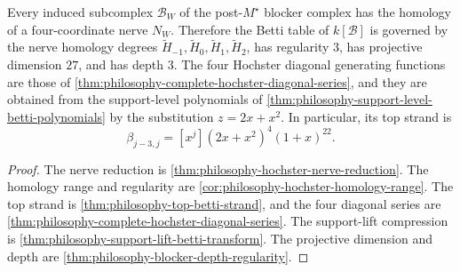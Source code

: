 \begin{theorem}
\label{thm:philosophy-hochster-nerve-betti-theorem}
Every induced subcomplex $\mathcal{B}_{W}$ of the post-$M^{\star}$
blocker complex has the homology of a four-coordinate nerve $N_{W}$.
Therefore the Betti table of $k[\mathcal{B}]$ is governed by the nerve
homology degrees $\widetilde{H}_{-1},\widetilde{H}_{0},
\widetilde{H}_{1},\widetilde{H}_{2}$, has regularity $3$, has
projective dimension $27$, and has depth $3$. The four Hochster
diagonal generating functions are those of
\autoref{thm:philosophy-complete-hochster-diagonal-series}, and they
are obtained from the support-level polynomials of
\autoref{thm:philosophy-support-level-betti-polynomials} by the
substitution $z=2x+x^{2}$. In particular, its top strand is
$$
  \beta_{j-3,j}
  =
  [x^{j}](2x+x^{2})^{4}(1+x)^{22}.
$$
\end{theorem}
\begin{proof}
The nerve reduction is
\autoref{thm:philosophy-hochster-nerve-reduction}. The homology range
and regularity are
\autoref{cor:philosophy-hochster-homology-range}. The top strand is
\autoref{thm:philosophy-top-betti-strand}, and the four diagonal
series are \autoref{thm:philosophy-complete-hochster-diagonal-series}.
The support-lift compression is
\autoref{thm:philosophy-support-lift-betti-transform}.
The projective dimension and depth are
\autoref{thm:philosophy-blocker-depth-regularity}.
\end{proof}

